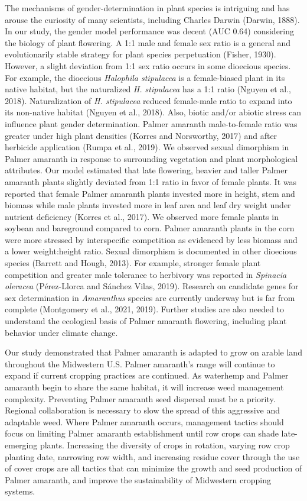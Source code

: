\documentclass[utf8]{frontiersSCNS}
\begin{document}
The mechanisms of gender-determination in plant species is intriguing
and has arouse the curiosity of many scientists, including Charles
Darwin (Darwin, 1888). In our study, the gender model performance was
decent (AUC 0.64) considering the biology of plant flowering. A 1:1 male
and female sex ratio is a general and evolutionarily stable strategy for
plant species perpetuation (Fisher, 1930). However, a slight deviation
from 1:1 sex ratio occurs in some dioecious species. For example, the
dioecious \emph{Halophila stipulacea} is a female-biased plant in its
native habitat, but the naturalized \emph{H. stipulacea} has a 1:1 ratio
(Nguyen et al., 2018). Naturalization of \emph{H. stipulacea} reduced
female-male ratio to expand into its non-native habitat (Nguyen et al.,
2018). Also, biotic and/or abiotic stress can influence plant gender
determination. Palmer amaranth male-to-female ratio was greater under
high plant densities (Korres and Norsworthy, 2017) and after herbicide
application (Rumpa et al., 2019). We observed sexual dimorphism in
Palmer amaranth in response to surrounding vegetation and plant
morphological attributes. Our model estimated that late flowering,
heavier and taller Palmer amaranth plants slightly deviated from 1:1
ratio in favor of female plants. It was reported that female Palmer
amaranth plants invested more in height, stem and biomass while male
plants invested more in leaf area and leaf dry weight under nutrient
deficiency (Korres et al., 2017). We observed more female plants in
soybean and bareground compared to corn. Palmer amaranth plants in the
corn were more stressed by interspecific competition as evidenced by
less biomass and a lower weight:height ratio. Sexual dimorphism is
documented in other dioecious species (Barrett and Hough, 2013). For
example, stronger female plant competition and greater male tolerance to
herbivory was reported in \emph{Spinacia oleracea} (Pérez-Llorca and
Sánchez Vilas, 2019). Research on candidate genes for sex determination
in \emph{Amaranthus} species are currently underway but is far from
complete (Montgomery et al., 2021, 2019). Further studies are also
needed to understand the ecological basis of Palmer amaranth flowering,
including plant behavior under climate change.

Our study demonstrated that Palmer amaranth is adapted to grow on arable
land throughout the Midwestern U.S. Palmer amaranth's range will
continue to expand if current cropping practices are continued. As
waterhemp and Palmer amaranth begin to share the same habitat, it will
increase weed management complexity. Preventing Palmer amaranth seed
dispersal must be a priority. Regional collaboration is necessary to
slow the spread of this aggressive and adaptable weed. Where Palmer
amaranth occurs, management tactics should focus on limiting Palmer
amaranth establishment until row crops can shade late-emerging plants.
Increasing the diversity of crops in rotation, varying row crop planting
date, narrowing row width, and increasing residue cover through the use
of cover crops are all tactics that can minimize the growth and seed
production of Palmer amaranth, and improve the sustainability of
Midwestern cropping systems.
\end{document}
